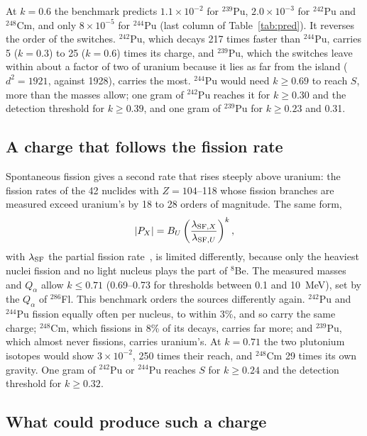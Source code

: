 \documentclass[aps,prd,onecolumn,superscriptaddress,floatfix,nofootinbib]{revtex4-2}
\newcommand{\Pu}[1]{$^{#1}$Pu}
\newcommand{\nuc}[2]{$^{#1}$#2}
\begin{document}
At $k=0.6$ the benchmark predicts $1.1\times10^{-2}$ for \Pu{239}, $2.0\times10^{-3}$ for \Pu{242} and
\nuc{248}{Cm}, and only $8\times10^{-5}$ for \Pu{244} (last column of Table~\ref{tab:pred}). It reverses the order of
the switches. \Pu{242}, which decays 217 times faster than \Pu{244}, carries 5 ($k=0.3$) to 25 ($k=0.6$) times its
charge, and \Pu{239}, which the switches leave within about a factor of two of uranium because it lies as far from the
island ($d^2=1921$, against 1928), carries the most. \Pu{244} would need $k\ge0.69$ to reach $S$, more than the masses
allow; one gram of \Pu{242} reaches it for $k\ge0.30$ and the detection threshold for $k\ge0.39$, and one gram of
\Pu{239} for $k\ge0.23$ and 0.31.

\subsection{A charge that follows the fission rate}\label{sec:fission}

Spontaneous fission gives a second rate that rises steeply above uranium: the fission rates of the 42 nuclides with
$Z=104$--118 whose fission branches are measured exceed uranium's by 18 to 28 orders of magnitude. The same form,
\begin{equation}
|P_X| = B_U\left(\frac{\lambda_{{\rm SF},X}}{\lambda_{{\rm SF},U}}\right)^{k},
\label{eq:fission}
\end{equation}
with $\lambda_{\rm SF}$ the partial fission rate~\cite{Kondev2021}, is limited differently, because only the heaviest
nuclei fission and no light nucleus plays the part of \nuc{8}{Be}. The measured masses and $Q_\alpha$ allow
$k\le0.71$ (0.69--0.73 for thresholds between 0.1 and 10~MeV), set by the $Q_\alpha$ of \nuc{286}{Fl}. This
benchmark orders the sources differently again. \Pu{242} and \Pu{244} fission equally often per nucleus, to within
3\%, and so carry the same charge; \nuc{248}{Cm}, which fissions in 8\% of its decays, carries far more; and
\Pu{239}, which almost never fissions, carries uranium's. At $k=0.71$ the two plutonium isotopes would show
$3\times10^{-2}$, 250 times their reach, and \nuc{248}{Cm} 29 times its own gravity. One gram of \Pu{242} or \Pu{244}
reaches $S$ for $k\ge0.24$ and the detection threshold for $k\ge0.32$.

\subsection{What could produce such a charge}\label{sec:theory}
\end{document}
